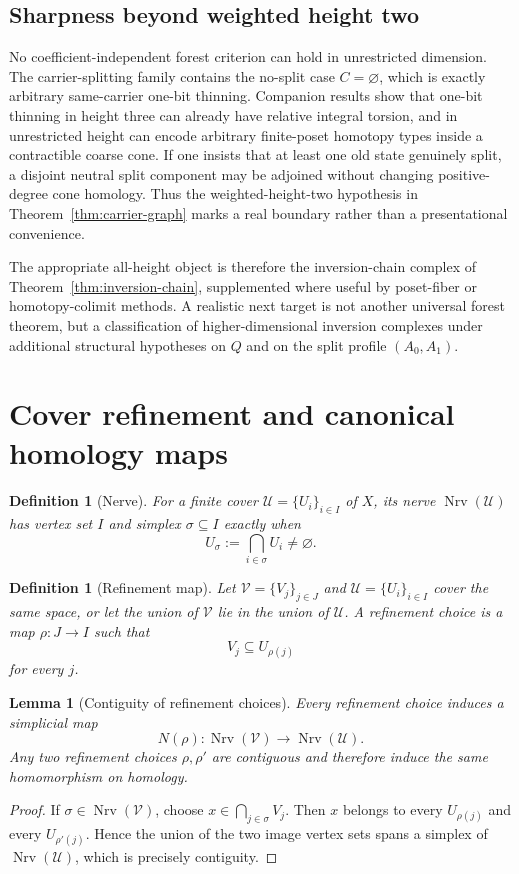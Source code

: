 \documentclass[11pt]{article}
\newtheorem{lemma}[theorem]{Lemma}
\newtheorem{definition}[theorem]{Definition}
\newcommand{\Nrv}{\operatorname{Nrv}}
\begin{document}
\subsection{Sharpness beyond weighted height two}

No coefficient-independent forest criterion can hold in unrestricted dimension.
The carrier-splitting family contains the no-split case $C=\varnothing$, which is
exactly arbitrary same-carrier one-bit thinning.  Companion results show that one-bit
thinning in height three can already have relative integral torsion, and in unrestricted
height can encode arbitrary finite-poset homotopy types inside a contractible coarse
cone.  If one insists that at least one old state genuinely split, a disjoint neutral
split component may be adjoined without changing positive-degree cone homology.
Thus the weighted-height-two hypothesis in Theorem~\ref{thm:carrier-graph} marks a
real boundary rather than a presentational convenience.

The appropriate all-height object is therefore the inversion-chain complex of
Theorem~\ref{thm:inversion-chain}, supplemented where useful by poset-fiber or
homotopy-colimit methods.  A realistic next target is not another universal forest
theorem, but a classification of higher-dimensional inversion complexes under
additional structural hypotheses on $Q$ and on the split profile $(A_0,A_1)$.


\section{Cover refinement and canonical homology maps}

\begin{definition}[Nerve]
For a finite cover $\mathcal U=\{U_i\}_{i\in I}$ of $X$, its nerve $\Nrv(\mathcal U)$ has vertex set $I$ and simplex $\sigma\subseteq I$ exactly when
\[
U_\sigma:=\bigcap_{i\in\sigma}U_i\neq\varnothing.
\]
\end{definition}

\begin{definition}[Refinement map]
Let $\mathcal V=\{V_j\}_{j\in J}$ and $\mathcal U=\{U_i\}_{i\in I}$ cover the same space, or let the union of $\mathcal V$ lie in the union of $\mathcal U$.  A refinement choice is a map $\rho:J\to I$ such that
\[
V_j\subseteq U_{\rho(j)}
\]
for every $j$.
\end{definition}

\begin{lemma}[Contiguity of refinement choices]\label{lem:contiguity}
Every refinement choice induces a simplicial map
\[
N(\rho):\Nrv(\mathcal V)\to\Nrv(\mathcal U).
\]
Any two refinement choices $\rho,\rho'$ are contiguous and therefore induce the same homomorphism on homology.
\end{lemma}
\begin{proof}
If $\sigma\in\Nrv(\mathcal V)$, choose $x\in\bigcap_{j\in\sigma}V_j$.  Then $x$ belongs to every $U_{\rho(j)}$ and every $U_{\rho'(j)}$.  Hence the union of the two image vertex sets spans a simplex of $\Nrv(\mathcal U)$, which is precisely contiguity.
\end{proof}
\end{document}

